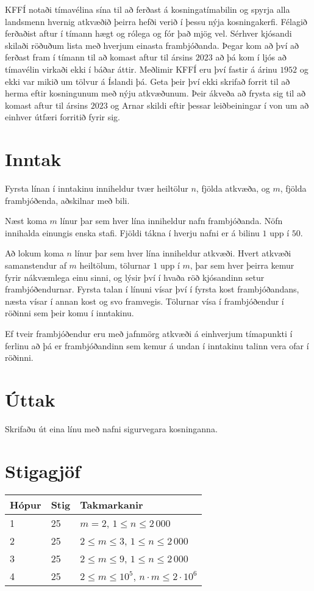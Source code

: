 KFFÍ notaði tímavélina sína til að ferðast á kosningatímabilin og spyrja alla landsmenn hvernig atkvæðið þeirra hefði verið í þessu nýja kosningakerfi.
Félagið ferðaðist aftur í tímann hægt og rólega og fór það mjög vel.
Sérhver kjósandi skilaði röðuðum lista með hverjum einasta frambjóðanda.
Þegar kom að því að ferðast fram í tímann til að komast aftur til ársins $2023$ að þá kom í ljós að tímavélin virkaði ekki í báðar áttir.
Meðlimir KFFÍ eru því fastir á árinu $1952$ og ekki var mikið um tölvur á Íslandi þá.
Geta þeir því ekki skrifað forrit til að herma eftir kosningunum með nýju atkvæðunum.
Þeir ákveða að frysta sig til að komast aftur til ársins $2023$ og Arnar skildi eftir þessar leiðbeiningar í von um að einhver útfæri forritið fyrir sig.

\section*{Inntak}
Fyrsta línan í inntakinu inniheldur tvær heiltölur $n$, fjölda atkvæða, og $m$, fjölda frambjóðenda, aðskilnar með bili.

Næst koma $m$ línur þar sem hver lína inniheldur nafn frambjóðanda.
Nöfn innihalda einungis enska stafi.
Fjöldi tákna í hverju nafni er á bilinu $1$ upp í $50$.

Að lokum koma $n$ línur þar sem hver lína inniheldur atkvæði.
Hvert atkvæði samanstendur af $m$ heiltölum, tölurnar $1$ upp í $m$, þar sem hver þeirra kemur fyrir nákvæmlega einu sinni, og lýsir því í hvaða röð kjósandinn setur frambjóðendurnar.
Fyrsta talan í línuni vísar því í fyrsta kost frambjóðandans, næsta vísar í annan kost og svo framvegis.
Tölurnar vísa í frambjóðendur í röðinni sem þeir komu í inntakinu.

Ef tveir frambjóðendur eru með jafnmörg atkvæði á einhverjum tímapunkti í ferlinu að þá er frambjóðandinn sem kemur á undan í inntakinu talinn vera ofar í röðinni.

\section*{Úttak}
Skrifaðu út eina línu með nafni sigurvegara kosninganna.

\section*{Stigagjöf}
\begin{tabular}{|l|l|l|}
\hline
Hópur & Stig & Takmarkanir \\ \hline
1     & 25   & $m = 2$, $1 \leq n \leq 2\,000$ \\ \hline
2     & 25   & $2 \leq m \leq 3$, $1 \leq n \leq 2\,000$ \\ \hline
3     & 25   & $2 \leq m \leq 9$, $1 \leq n \leq 2\,000$ \\ \hline
4     & 25   & $2 \leq m \leq 10^5$, $n \cdot m \leq 2 \cdot 10^6$ \\ \hline
\end{tabular}
